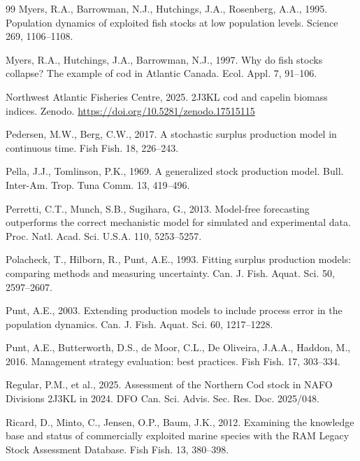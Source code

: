 \begin{thebibliography}{99}
Myers, R.A., Barrowman, N.J., Hutchings, J.A., Rosenberg, A.A., 1995. Population dynamics of exploited fish stocks at low population levels. Science 269, 1106--1108.

Myers, R.A., Hutchings, J.A., Barrowman, N.J., 1997. Why do fish stocks collapse? The example of cod in Atlantic Canada. Ecol. Appl. 7, 91--106.

Northwest Atlantic Fisheries Centre, 2025. 2J3KL cod and capelin biomass indices. Zenodo. \url{https://doi.org/10.5281/zenodo.17515115}

Pedersen, M.W., Berg, C.W., 2017. A stochastic surplus production model in continuous time. Fish Fish. 18, 226--243.

Pella, J.J., Tomlinson, P.K., 1969. A generalized stock production model. Bull. Inter-Am. Trop. Tuna Comm. 13, 419--496.

Perretti, C.T., Munch, S.B., Sugihara, G., 2013. Model-free forecasting outperforms the correct mechanistic model for simulated and experimental data. Proc. Natl. Acad. Sci. U.S.A. 110, 5253--5257.

Polacheck, T., Hilborn, R., Punt, A.E., 1993. Fitting surplus production models: comparing methods and measuring uncertainty. Can. J. Fish. Aquat. Sci. 50, 2597--2607.

Punt, A.E., 2003. Extending production models to include process error in the population dynamics. Can. J. Fish. Aquat. Sci. 60, 1217--1228.

Punt, A.E., Butterworth, D.S., de Moor, C.L., De Oliveira, J.A.A., Haddon, M., 2016. Management strategy evaluation: best practices. Fish Fish. 17, 303--334.

Regular, P.M., et al., 2025. Assessment of the Northern Cod stock in NAFO Divisions 2J3KL in 2024. DFO Can. Sci. Advis. Sec. Res. Doc. 2025/048.

Ricard, D., Minto, C., Jensen, O.P., Baum, J.K., 2012. Examining the knowledge base and status of commercially exploited marine species with the RAM Legacy Stock Assessment Database. Fish Fish. 13, 380--398.


\end{thebibliography}
